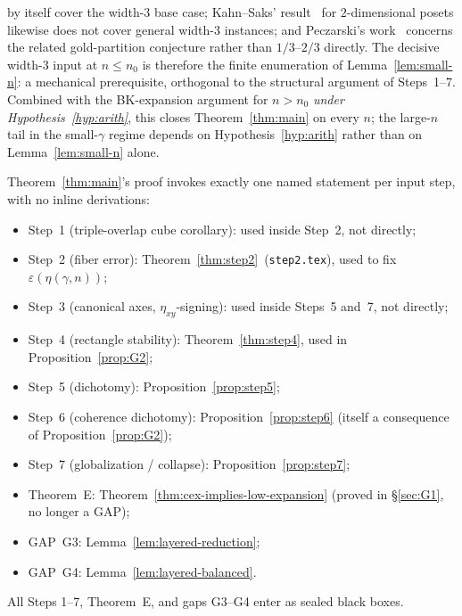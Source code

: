 \begin{remark}
by itself cover the width-$3$ base case; Kahn--Saks'
result~\cite{KahnSaks1984} for $2$-dimensional posets likewise
does not cover general width-$3$ instances; and Peczarski's
work~\cite{Peczarski2008} concerns the related gold-partition
conjecture rather than $1/3$--$2/3$ directly. The decisive
width-$3$ input at $n \le n_0$ is therefore the finite enumeration
of Lemma~\ref{lem:small-n}: a mechanical prerequisite, orthogonal to
the structural argument of Steps~1--7. Combined with the BK-expansion
argument for $n > n_0$ \emph{under Hypothesis~\ref{hyp:arith}}, this
closes Theorem~\ref{thm:main} on every $n$; the large-$n$ tail in
the small-$\gamma$ regime depends on Hypothesis~\ref{hyp:arith}
rather than on Lemma~\ref{lem:small-n} alone.
\end{remark}

\begin{remark}\label{rem:one-invocation}
Theorem~\ref{thm:main}'s proof invokes exactly one named statement per
input step, with no inline derivations:
\begin{itemize}[nosep]
 \item Step~1 (triple-overlap cube corollary): used inside Step~2, not
 directly;
 \item Step~2 (fiber error):
 Theorem~\ref{thm:step2}~(\texttt{step2.tex}), used to fix
 $\varepsilon(\eta(\gamma, n))$;
 \item Step~3 (canonical axes, $\eta_{xy}$-signing): used inside
 Steps~5 and~7, not directly;
 \item Step~4 (rectangle stability):
 Theorem~\ref{thm:step4}, used in Proposition~\ref{prop:G2};
 \item Step~5 (dichotomy): Proposition~\ref{prop:step5};
 \item Step~6 (coherence dichotomy): Proposition~\ref{prop:step6}
 (itself a consequence of Proposition~\ref{prop:G2});
 \item Step~7 (globalization / collapse): Proposition~\ref{prop:step7};
 \item Theorem~E: Theorem~\ref{thm:cex-implies-low-expansion}
 (proved in \S\ref{sec:G1}, no longer a GAP);
 \item GAP~G3: Lemma~\ref{lem:layered-reduction};
 \item GAP~G4: Lemma~\ref{lem:layered-balanced}.
\end{itemize}
All Steps 1--7, Theorem~E, and gaps G3--G4 enter as sealed black
boxes.
\end{remark}

